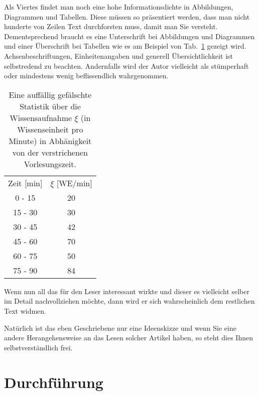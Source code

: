 \documentclass[10pt,twocolumn]{scrartcl}
\begin{document}
Als Viertes findet man noch eine hohe Informationsdichte in
Abbildungen, Diagrammen und Tabellen. Diese müssen so präsentiert werden,
dass man nicht hunderte von Zeilen Text durchforsten muss, damit man Sie versteht.
Dementsprechend braucht es eine Unterschrift bei Abbildungen und Diagrammen 
und einer Überschrift bei Tabellen wie es am Beispiel von Tab.~\ref{tab:falsch}
gezeigt wird. Achsenbeschriftungen, Einheitenangaben
und generell Übersichtlichkeit ist selbstredend zu beachten.
Andernfalls wird der Autor vielleicht als stümperhaft oder mindestens
wenig beflissendlich wahrgenommen.
% 
\begin{table}[t]
\caption{Eine auffällig gefälschte Statistik über die Wissensaufnahme $\xi$
(in Wissenseinheit pro Minute) in Abhänigkeit von der verstrichenen Vorlesungszeit.}
\label{tab:falsch}
\centering
\begin{tabular}{cc}
\rowcolor{dunkelgrau}
Zeit [min] & $\xi$ [WE/min] \\
0 - 15 & 20 \\
\rowcolor{grau}
15 - 30 & 30 \\
30 - 45 & 42 \\
\rowcolor{grau}
45 - 60 & 70 \\
60 - 75 & 50 \\
\rowcolor{grau}
75 - 90 & 84
\end{tabular}
\end{table}
% 
Wenn nun all das für den Leser interessant wirkte und dieser es vielleicht
selber im Detail nachvollziehen möchte, dann wird er sich wahrscheinlich
dem restlichen Text widmen.

Natürlich ist das eben Geschriebene nur eine Ideenskizze und wenn
Sie eine andere Herangehensweise an das Lesen solcher Artikel haben,
so steht dies Ihnen selbstverständlich frei.

\section*{Durchführung}
\end{document}
